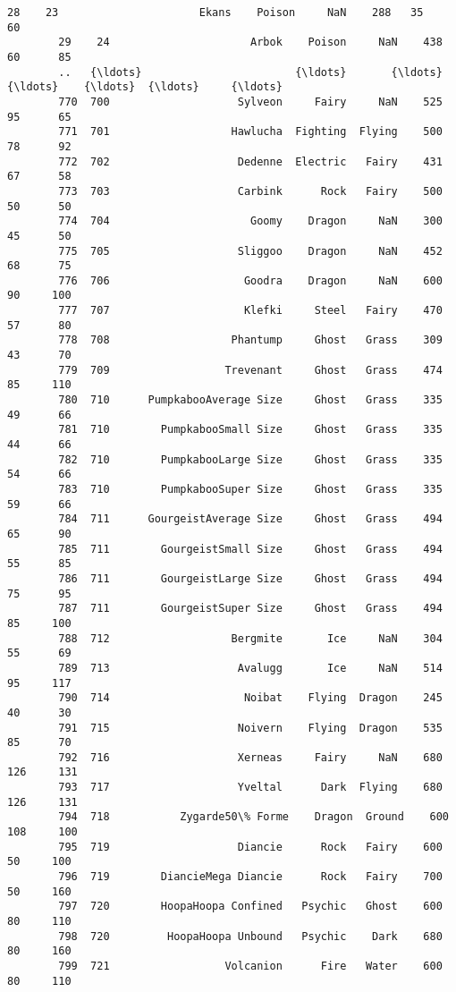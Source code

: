 \documentclass[11pt]{article}
\begin{document}
\begin{Verbatim}[commandchars=\\\{\}]
        28    23                      Ekans    Poison     NaN    288   35      60   
        29    24                      Arbok    Poison     NaN    438   60      85   
        ..   {\ldots}                        {\ldots}       {\ldots}     {\ldots}    {\ldots}  {\ldots}     {\ldots}   
        770  700                    Sylveon     Fairy     NaN    525   95      65   
        771  701                   Hawlucha  Fighting  Flying    500   78      92   
        772  702                    Dedenne  Electric   Fairy    431   67      58   
        773  703                    Carbink      Rock   Fairy    500   50      50   
        774  704                      Goomy    Dragon     NaN    300   45      50   
        775  705                    Sliggoo    Dragon     NaN    452   68      75   
        776  706                     Goodra    Dragon     NaN    600   90     100   
        777  707                     Klefki     Steel   Fairy    470   57      80   
        778  708                   Phantump     Ghost   Grass    309   43      70   
        779  709                  Trevenant     Ghost   Grass    474   85     110   
        780  710      PumpkabooAverage Size     Ghost   Grass    335   49      66   
        781  710        PumpkabooSmall Size     Ghost   Grass    335   44      66   
        782  710        PumpkabooLarge Size     Ghost   Grass    335   54      66   
        783  710        PumpkabooSuper Size     Ghost   Grass    335   59      66   
        784  711      GourgeistAverage Size     Ghost   Grass    494   65      90   
        785  711        GourgeistSmall Size     Ghost   Grass    494   55      85   
        786  711        GourgeistLarge Size     Ghost   Grass    494   75      95   
        787  711        GourgeistSuper Size     Ghost   Grass    494   85     100   
        788  712                   Bergmite       Ice     NaN    304   55      69   
        789  713                    Avalugg       Ice     NaN    514   95     117   
        790  714                     Noibat    Flying  Dragon    245   40      30   
        791  715                    Noivern    Flying  Dragon    535   85      70   
        792  716                    Xerneas     Fairy     NaN    680  126     131   
        793  717                    Yveltal      Dark  Flying    680  126     131   
        794  718           Zygarde50\% Forme    Dragon  Ground    600  108     100   
        795  719                    Diancie      Rock   Fairy    600   50     100   
        796  719        DiancieMega Diancie      Rock   Fairy    700   50     160   
        797  720        HoopaHoopa Confined   Psychic   Ghost    600   80     110   
        798  720         HoopaHoopa Unbound   Psychic    Dark    680   80     160   
        799  721                  Volcanion      Fire   Water    600   80     110   
        

\end{Verbatim}
\end{document}
